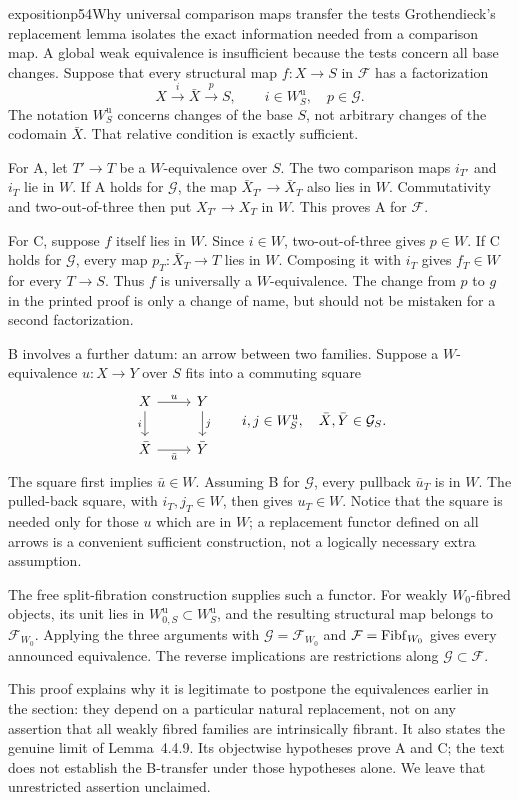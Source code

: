 \begin{dcomment}{exposition}{p54}{Why universal comparison maps transfer the tests}
Grothendieck's replacement lemma isolates the exact information needed from a comparison map. A global weak equivalence is insufficient because the tests concern all base changes. Suppose that every structural map $f:X\to S$ in $\mathcal F$ has a factorization
\[
 X\xrightarrow{\ i\ }\bar X\xrightarrow{\ p\ }S,
 \qquad i\in W_S^{\mathrm u},\quad p\in\mathcal G.
\]
The notation $W_S^{\mathrm u}$ concerns changes of the base $S$, not arbitrary changes of the codomain $\bar X$. That relative condition is exactly sufficient.

For A, let $T'\to T$ be a $W$-equivalence over $S$. The two comparison maps $i_{T'}$ and $i_T$ lie in $W$. If A holds for $\mathcal G$, the map $\bar X_{T'}\to\bar X_T$ also lies in $W$. Commutativity and two-out-of-three then put $X_{T'}\to X_T$ in $W$. This proves A for $\mathcal F$.

For C, suppose $f$ itself lies in $W$. Since $i\in W$, two-out-of-three gives $p\in W$. If C holds for $\mathcal G$, every map $p_T:\bar X_T\to T$ lies in $W$. Composing it with $i_T$ gives $f_T\in W$ for every $T\to S$. Thus $f$ is universally a $W$-equivalence. The change from $p$ to $g$ in the printed proof is only a change of name, but should not be mistaken for a second factorization.

B involves a further datum: an arrow between two families. Suppose a $W$-equivalence $u:X\to Y$ over $S$ fits into a commuting square
\[
\begin{tikzcd}
 X\arrow[r,"u"]\arrow[d,"i"']&Y\arrow[d,"j"]\\
 \bar X\arrow[r,"\bar u"']&\bar Y
\end{tikzcd}
\qquad
 i,j\in W_S^{\mathrm u},\quad \bar X,\bar Y\in\mathcal G_S.
\]
The square first implies $\bar u\in W$. Assuming B for $\mathcal G$, every pullback $\bar u_T$ is in $W$. The pulled-back square, with $i_T,j_T\in W$, then gives $u_T\in W$. Notice that the square is needed only for those $u$ which are in $W$; a replacement functor defined on all arrows is a convenient sufficient construction, not a logically necessary extra assumption.

The free split-fibration construction supplies such a functor. For weakly $W_0$-fibred objects, its unit lies in $W_{0,S}^{\mathrm u}\subset W_S^{\mathrm u}$, and the resulting structural map belongs to $\mathcal F_{W_0}$. Applying the three arguments with $\mathcal G=\mathcal F_{W_0}$ and $\mathcal F=\mathrm{Fibf}_{W_0}$ gives every announced equivalence. The reverse implications are restrictions along $\mathcal G\subset\mathcal F$.

This proof explains why it is legitimate to postpone the equivalences earlier in the section: they depend on a particular natural replacement, not on any assertion that all weakly fibred families are intrinsically fibrant. It also states the genuine limit of Lemma~4.4.9. Its objectwise hypotheses prove A and C; the text does not establish the B-transfer under those hypotheses alone. We leave that unrestricted assertion unclaimed.
\end{dcomment}


